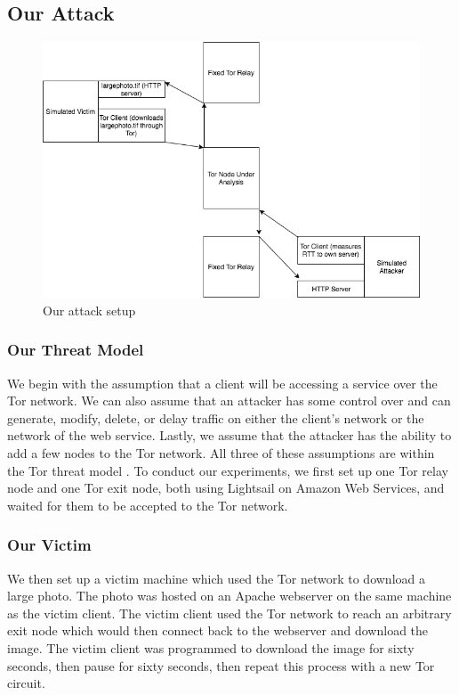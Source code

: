 \documentclass[12pt,journal]{IEEEtran}
\begin{document}
\subsection{Our Attack}
\begin{figure}
 \center
  \includegraphics[width=\textwidth]{figures/oursetup.png}
  \caption{Our attack setup}
  \label{oursetup}
\end{figure}
\subsubsection{Our Threat Model}
We begin with the assumption that a client will be accessing a service over the Tor network. We can also assume that an attacker has some control over and can generate, modify, delete, or delay traffic on either the client's network or the network of the web service. Lastly, we assume that the attacker has the ability to add a few nodes to the Tor network. All three of these assumptions are within the Tor threat model \cite{Dingledine:2004:TSO:1251375.1251396}.
To conduct our experiments, we first set up one Tor relay node and one Tor exit node, both using Lightsail on Amazon Web Services, and waited for them to be accepted to the Tor network.
\subsubsection{Our Victim}We then set up a victim machine which used the Tor network to download a large photo. The photo was hosted on an Apache webserver on the same machine as the victim client. The victim client used the Tor network to reach an arbitrary exit node which would then connect back to the webserver and download the image. The victim client was programmed to download the image for sixty seconds, then pause for sixty seconds, then repeat this process with a new Tor circuit.
\end{document}
